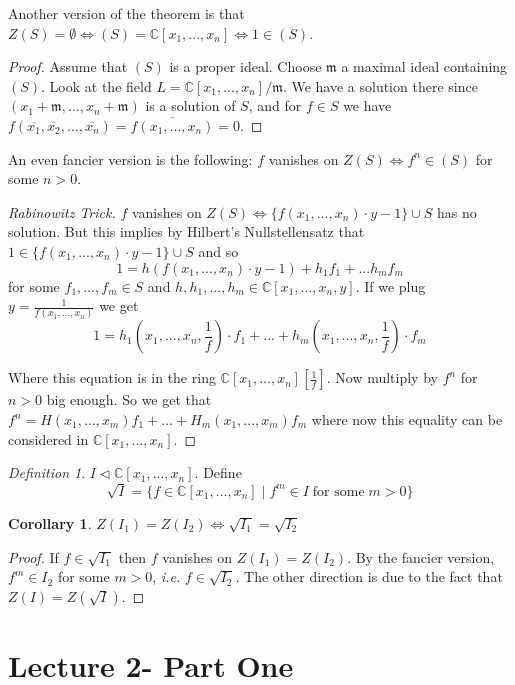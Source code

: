 \documentclass[12pt]{article}
\newtheorem{corollary}[theorem]{Corollary}
\theoremstyle{remark}
\newtheorem{definition}[theorem]{Definition}
\newcommand{\ie}{\emph{i.e.} }
\newcommand{\C}{\mathbb{C}}
\begin{document}
Another version of the theorem is that $Z(S) = \emptyset \iff (S) = \C[x_1,...,x_n] \iff 1 \in (S)$.

\begin{proof}

Assume that $(S)$ is a proper ideal. Choose $\mathfrak{m}$ a maximal ideal containing $(S)$. Look at the field $L = \C[x_1,...,x_n]/ \mathfrak{m}$. We have a solution there since $(x_1+\mathfrak{m}, ... ,x_n+ \mathfrak{m})$ is a solution of $S$, and for $f \in S$ we have
$f(\overline{x_1}, \overline{x_2}, ..., \overline{x_n}) = \overline{f(x_1,...,x_n)}  = 0$.
\end{proof}

An even fancier version is the following: $f$ vanishes on $Z(S) \iff  f^n \in (S)$ for some $n>0$.

\begin{proof}[Rabinowitz Trick]
$f$ vanishes on $Z(S) \iff \{ f(x_1,...,x_n) \cdot y - 1 \} \cup S$ has no solution. But this implies by Hilbert's Nullstellensatz that $1 \in \{f(x_1,...,x_n) \cdot y - 1 \} \cup S$ and so $$1 = h(f(x_1,...,x_n)\cdot y -1) + h_1 f_1 +...h_m f_m$$ for some $f_1,...,f_m \in S$ and $h,h_1,...,h_m \in \C[x_1,...,x_n,y]$. If we plug $y = \frac{1}{f(x_1,...,x_n)}$ we get 
$$1 = h_1(x_1,...,x_n,\frac{1}{f}) \cdot f_1+...+h_m(x_1,...,x_n,\frac{1}{f}) \cdot f_m $$

Where this equation is in the ring $\C[x_1,...,x_n][\frac{1}{f}]$. Now multiply by $f^n$ for $n>0$ big enough. So we get that $f^n = H(x_1,...,x_m)f_1 + ... +H_m(x_1,...,x_m)f_m$ where now this equality can be considered in $\C[x_1,...,x_n]$.
\end{proof}

\begin{definition}
$I \lhd \C[x_1,...,x_n]$. Define 
$$\sqrt{I} = \{ f \in \C[x_1,...,x_n] \; | \; f^m \in I \; \text{for some} \; m>0 \} $$
\end{definition}

\begin{corollary}
$Z(I_1) = Z(I_2) \iff \sqrt{I_1} = \sqrt{I_2}$
\end{corollary}

\begin{proof}
If $f \in \sqrt{I_1}$ then $f$ vanishes on $Z(I_1)= Z(I_2)$. By the fancier version, $f^m \in I_2$ for some $m>0$, \ie $f \in \sqrt{I_2}$. The other direction is due to the fact that $Z(I) = Z(\sqrt{I})$.
\end{proof}

\section{Lecture 2- Part One}
\end{document}
